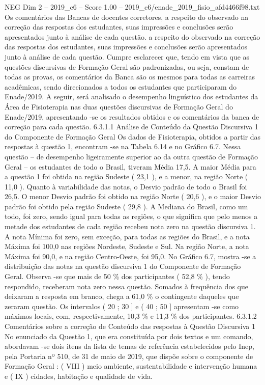 \begin{textsample}{NEG Dim 2 – 2019\_c6 – Score 1.00 – 2019\_c6/enade\_2019\_fisio\_afd4466f98.txt}
Os comentários das Bancas de docentes corretores, a respeito do observado na correção das respostas dos estudantes, suas impressões e conclusões serão apresentados junto à análise de cada questão. a respeito do observado na correção das respostas dos estudantes, suas impressões e conclusões serão apresentados junto à análise de cada questão.
Cumpre esclarecer que, tendo em vista que as questões discursivas de Formação Geral são padronizadas, ou seja, constam de todas as provas, os comentários da Banca são os mesmos para todas as carreiras acadêmicas, sendo direcionados a todos os estudantes que participaram do Enade/2019.
A seguir, será analisado o desempenho linguístico dos estudantes da Área de Fisioterapia nas duas questões discursivas de Formação Geral do Enade/2019, apresentando -se os resultados obtidos e os comentários da banca de correção para cada questão. 6.3.1.1 Análise de Conteúdo da Questão Discursiva 1 do Componente de Formação Geral Os dados de Fisioterapia, obtidos a partir das respostas à questão 1, encontram -se na Tabela 6.14 e no Gráfico 6.7.
Nessa questão – de desempenho ligeiramente superior ao da outra questão de Formação Geral – os estudantes de todo o Brasil, tiveram Média 17,5.
A maior Média para a questão 1 foi obtida na região Sudeste ( 23,1 ), e a menor, na região Norte ( 11,0 ).
Quanto à variabilidade das notas, o Desvio padrão de todo o Brasil foi 26,5.
O menor Desvio padrão foi obtido na região Norte ( 20,6 ), e o maior Desvio padrão foi obtido pela região Sudeste ( 29,8 ).
A Mediana do Brasil, como um todo, foi zero, sendo igual para todas as regiões, o que significa que pelo menos a metade dos estudantes de cada região recebeu nota zero na questão discursiva 1.
A nota Mínima foi zero, sem exceção, para todas as regiões do Brasil, e a nota Máxima foi 100,0 nas regiões Nordeste, Sudeste e Sul.
Na região Norte, a nota Máxima foi 90,0, e na região Centro-Oeste, foi 95,0.
No Gráfico 6.7, mostra -se a distribuição das notas na questão discursiva 1 do Componente de Formação Geral.
Observa -se que mais de 50 \% dos participantes ( 52,8 \% ), tendo respondido, receberam nota zero nessa questão.
Somados à frequência dos que deixaram a resposta em branco, chega a 61,0 \% o contingente daqueles que zeraram questão.
Os intervalos ( 20 ; 30 ] e ( 40 ; 50 ] apresentam -se como máximos locais, com, respectivamente, 10,3 \% e 11,3 \% dos participantes. 6.3.1.2 Comentários sobre a correção de Conteúdo das respostas à Questão Discursiva 1 No enunciado da Questão 1, que era constituída por dois textos e um comando, abordavam -se dois itens da lista de temas de referência estabelecidos pelo Inep, pela Portaria nº 510, de 31 de maio de 2019, que dispõe sobre o componente de Formação Geral : ( VIII ) meio ambiente, sustentabilidade e intervenção humana e ( IX ) cidades, habitação e qualidade de vida.

\end{textsample}
